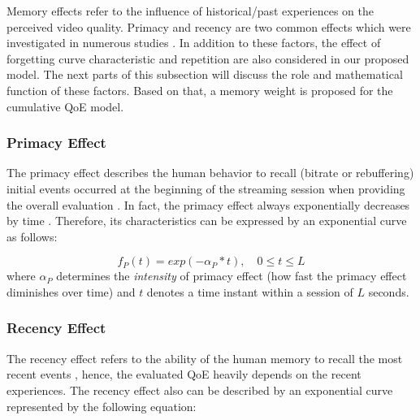 Memory effects refer to the influence of historical/past experiences on the perceived video quality. Primacy and recency are two common effects which were investigated in numerous studies \cite{QoEModel_LSTM, QoEModel_TVQoE_ContinuousTimeQoE, QoEModel_NARX_DynamicNetworks}. In addition to these factors, the effect of forgetting curve characteristic and repetition are also considered in our proposed model.
The next parts of this subsection will discuss the role and mathematical function of these factors. Based on that, a memory weight is proposed for the cumulative QoE model.

\subsubsection{Primacy Effect}

The primacy effect \cite{SerialPositionEffect_FreeRecall, PrimacyVsRecency} describes the human behavior to recall (bitrate or rebuffering) initial events occurred at the beginning of the streaming session when providing the overall evaluation \cite{RehearsalProcessesInFreeRecall}. In fact, the primacy effect always exponentially decreases by time \cite{SerialPositionEffect_FreeRecall}. Therefore, its characteristics can be expressed by an exponential curve as follows:
    
\begin{equation} \label{eqn:Primacy}
  f_{P}(t) = exp(-\alpha_{P}*t), \quad 0 \leq t \leq L
\end{equation}
where $\alpha_{P}$ determines the \textit{intensity} of primacy effect (how fast the primacy effect diminishes over time) and $t$ denotes a time instant within a session of $L$ seconds.


\subsubsection{Recency Effect}

The recency effect \cite{SerialPositionEffect_FreeRecall,PrimacyVsRecency} refers to the ability of the human memory to recall the most recent events \cite{RehearsalProcessesInFreeRecall}, hence, the evaluated QoE heavily depends on the recent experiences. The recency effect also can be described by an exponential curve represented by the following equation:
    
